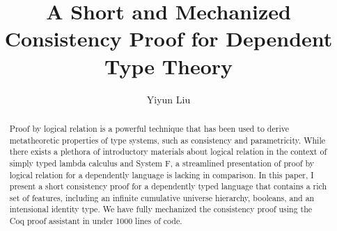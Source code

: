 \documentclass[acmsmall]{acmart}
\begin{document}
\title{A Short and Mechanized Consistency Proof for Dependent Type Theory}

\author{Yiyun Liu}


\begin{abstract}
Proof by logical relation is a powerful technique that has been used
to derive metatheoretic properties of type systems, such as
consistency and parametricity. While there exists a
plethora of introductory materials about logical relation in the
context of simply typed lambda calculus and System F, a streamlined
presentation of proof by logical relation for a dependently language
is lacking in comparison. In this paper, I present a short
consistency proof for a dependently typed language that contains a
rich set of features, including an infinite cumulative universe
hierarchy, booleans, and an intensional identity type. We have
fully mechanized the consistency proof using the Coq proof assistant
in under 1000 lines of code.
\end{abstract}


\maketitle
\end{document}
